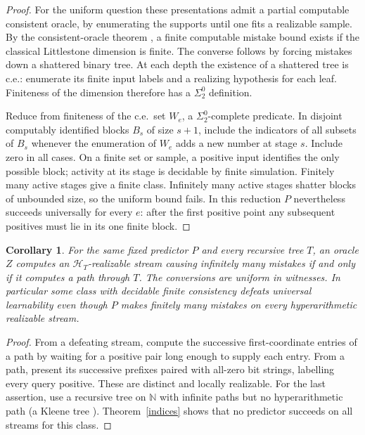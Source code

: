 \documentclass[11pt]{article}
\newtheorem{corollary}[theorem]{Corollary}
\newcommand{\N}{\mathbb N}
\newcommand{\HH}{\mathcal H}
\begin{document}
\begin{proof}
For the uniform question these presentations admit a partial computable consistent oracle, by enumerating the supports until one fits a realizable sample. By the consistent-oracle theorem \cite{oracle}, a finite computable mistake bound exists if the classical Littlestone dimension is finite. The converse follows by forcing mistakes down a shattered binary tree. At each depth the existence of a shattered tree is c.e.: enumerate its finite input labels and a realizing hypothesis for each leaf. Finiteness of the dimension therefore has a $\Sigma^0_2$ definition.

Reduce from finiteness of the c.e.\ set $W_e$, a $\Sigma^0_2$-complete predicate. In disjoint computably identified blocks $B_s$ of size $s+1$, include the indicators of all subsets of $B_s$ whenever the enumeration of $W_e$ adds a new number at stage $s$. Include zero in all cases. On a finite set or sample, a positive input identifies the only possible block; activity at its stage is decidable by finite simulation. Finitely many active stages give a finite class. Infinitely many active stages shatter blocks of unbounded size, so the uniform bound fails. In this reduction $P$ nevertheless succeeds universally for every $e$: after the first positive point any subsequent positives must lie in its one finite block.
\end{proof}

\begin{corollary}\label{oracles}
For the same fixed predictor $P$ and every recursive tree $T$, an oracle $Z$ computes an $\HH_T$-realizable stream causing infinitely many mistakes if and only if it computes a path through $T$. The conversions are uniform in witnesses. In particular some class with decidable finite consistency defeats universal learnability even though $P$ makes finitely many mistakes on every hyperarithmetic realizable stream.
\end{corollary}
\begin{proof}
From a defeating stream, compute the successive first-coordinate entries of a path by waiting for a positive pair long enough to supply each entry. From a path, present its successive prefixes paired with all-zero bit strings, labelling every query positive. These are distinct and locally realizable. For the last assertion, use a recursive tree on $\N$ with infinite paths but no hyperarithmetic path (a Kleene tree \cite{sacks}). Theorem~\ref{indices} shows that no predictor succeeds on all streams for this class.
\end{proof}
\end{document}
